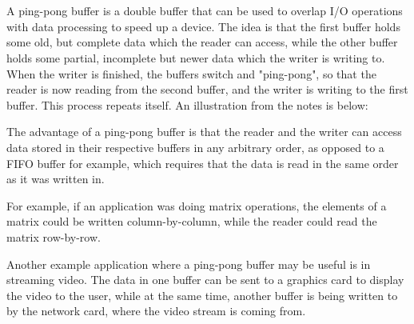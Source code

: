 \section{}

A ping-pong buffer is a double buffer that can be used to overlap I/O operations
with data processing to speed up a device.  The idea is that the first buffer
holds some old, but complete data which the reader can access, while the other
buffer holds some partial, incomplete but newer data which the writer is writing
to. When the writer is finished, the buffers switch and "ping-pong", so that the
reader is now reading from the second buffer, and the writer is writing to the
first buffer. This process repeats itself.
An illustration from the notes is below:

  

  The advantage of a ping-pong buffer is that the reader and the writer can
  access data stored in their respective buffers in any arbitrary order,
  as opposed to a FIFO buffer for example, which requires that the data is read
  in the same order as it was written in. 

  For example, if an application was doing matrix operations, the elements of a
  matrix could be written column-by-column, while the reader could read the
  matrix row-by-row.

  Another example application where a ping-pong buffer may be useful is in
  streaming video. The data in one buffer can be sent to a graphics card to
  display the video to the user, while at the same time, another buffer is being
  written to by the network card, where the video stream is coming from.
